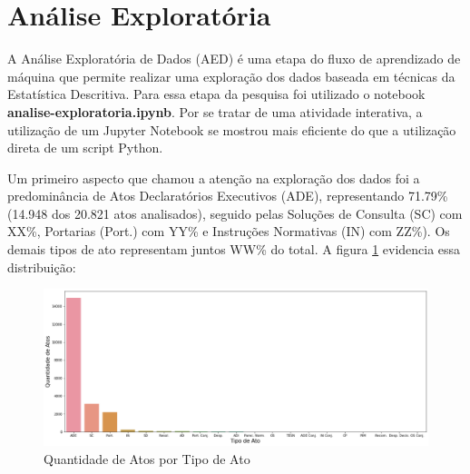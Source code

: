 \section{Análise Exploratória}

A Análise Exploratória de Dados (AED) é uma etapa do fluxo de aprendizado de máquina que permite realizar uma exploração dos dados baseada em técnicas da Estatística Descritiva. Para essa etapa da pesquisa foi utilizado o notebook \textbf{analise-exploratoria.ipynb}. Por se tratar de uma atividade interativa, a utilização de um Jupyter Notebook se mostrou mais eficiente do que a utilização direta de um script Python.

Um primeiro aspecto que chamou a atenção na exploração dos dados foi a predominância de Atos Declaratórios Executivos (ADE), representando 71.79\% (14.948 dos 20.821 atos analisados), seguido pelas Soluções de Consulta (SC) com XX\%, Portarias (Port.) com YY\% e Instruções Normativas (IN) com ZZ\%). Os demais tipos de ato representam juntos WW\% do total. A figura \ref{fig:atos-por-tipo-ato} evidencia essa distribuição:

\begin{figure}[h]
	\caption{Quantidade de Atos por Tipo de Ato}
	\center
	\label{fig:atos-por-tipo-ato}
	\includegraphics[scale=0.4]{exploratoria/atos-por-tipo-ato.png}
	\fdp
\end{figure}